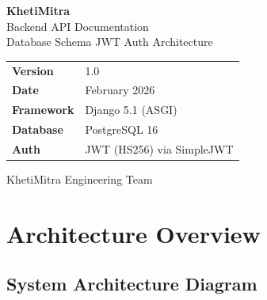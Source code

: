 \documentclass[11pt,a4paper]{article}
\begin{document}
\begin{titlepage}
\centering
\vspace*{3cm}

{\Huge\bfseries\color{primary} KhetiMitra}\\[0.5cm]
{\LARGE Backend API Documentation}\\[0.3cm]
{\large Database Schema \textbullet{} JWT Auth \textbullet{} Architecture}

\vspace{1.5cm}


\vspace{2cm}

\begin{tabular}{ll}
    \textbf{Version} & 1.0 \\
    \textbf{Date} & February 2026 \\
    \textbf{Framework} & Django 5.1 (ASGI) \\
    \textbf{Database} & PostgreSQL 16 \\
    \textbf{Auth} & JWT (HS256) via SimpleJWT \\
\end{tabular}

\vfill
{\small KhetiMitra Engineering Team}
\end{titlepage}

\tableofcontents
\newpage

\section{Architecture Overview}

\subsection{System Architecture Diagram}
\end{document}
